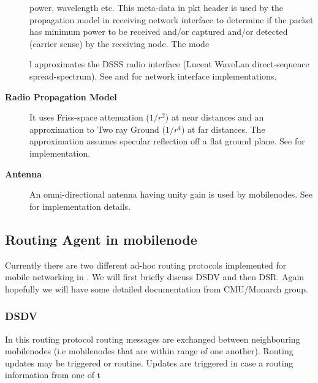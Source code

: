 \begin{description}
power, wavelength etc. This meta-data in pkt header is used by the propagation model in receiving network interface to determine if the packet has minimum power to be received and/or captured and/or detected (carrier sense) by the receiving node. The mode











l approximates the DSSS radio interface (Lucent WaveLan direct-sequence spread-spectrum). See  and  for network interface implementations.

\item[{\bf Radio Propagation Model}]  It uses Friss-space attenuation ($1/r^2$) at near distances and an approximation to Two ray Ground ($1/r^4$) at far distances. The approximation assumes specular reflection off a flat ground plane. See  for implementation.

\item[{\bf Antenna}] An omni-directional antenna having unity gain is used by mobilenodes. See  for implementation details.
\end{description}

\subsection{Routing Agent in mobilenode}
\label{sec:mobilenode-routing}

Currently there are two different ad-hoc routing protocols implemented for mobile networking in \ns. We will first briefly discuss DSDV and then DSR. Again hopefully we will have some detailed documentation from CMU/Monarch group.

\subsubsection{DSDV}
\label{sec:dsdv}

In this routing protocol routing messages are exchanged between neighbouring mobilenodes (i.e mobilenodes that are within range of one another). Routing updates may be triggered or routine. Updates are triggered in case a routing information from one of t











